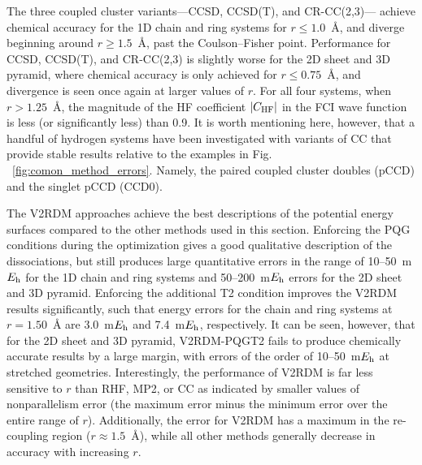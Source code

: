 \documentclass[aip,jcp,amsmath,amssymb, reprint]{revtex4-1}
\newcommand*{\Eh}{$E_{\rm h}$\xspace}
\begin{document}
The three coupled cluster variants---CCSD, CCSD(T), and CR-CC(2,3)--- achieve chemical accuracy for the 1D chain and ring systems for $r\leq1.0$~{\AA}, and diverge beginning around $r\geq1.5$~{\AA}, past the Coulson--Fisher point. 
Performance for CCSD, CCSD(T), and CR-CC(2,3) is slightly worse for the 2D sheet and 3D pyramid, where chemical accuracy is only achieved for $r\leq0.75$~{\AA}, and divergence is seen once again at larger values of $r$.   
For all four systems, when $r>1.25$~{\AA}, the magnitude of the HF coefficient $|C_{\rm{HF}}|$ in the FCI wave function is less (or significantly less) than 0.9.
It is worth mentioning here, however, that a handful of hydrogen systems have been investigated with variants of CC that provide stable results relative to the examples in Fig. ~\ref{fig:comon_method_errors}. Namely, the paired coupled cluster doubles (pCCD) \cite{Limacher2013NewMean} and the singlet pCCD (CCD0). \cite{Bulik2015CanSingle}
           
The V2RDM approaches achieve the best descriptions of the potential energy surfaces compared to the other methods used in this section. Enforcing the PQG conditions during the optimization gives a good qualitative description of the dissociations, but still produces large quantitative errors in the range of 10--50~m\Eh for the 1D chain and ring systems and 50--200~m\Eh errors for the 2D sheet and 3D pyramid.
Enforcing the additional T2 condition improves the V2RDM results significantly, such that energy errors for the chain and ring systems at $r=1.50$~{\AA} are 3.0~m\Eh and 7.4~m\Eh, respectively.
It can be seen, however, that for the 2D sheet and 3D pyramid, V2RDM-PQGT2 fails to produce chemically accurate results by a large margin, with errors of the order of 10--50~m\Eh at stretched geometries.  
Interestingly, the performance of V2RDM is far less sensitive to $r$ than RHF, MP2, or CC as indicated by smaller values of nonparallelism error (the maximum error minus the minimum error over the entire range of $r$). 
Additionally, the error for V2RDM has a maximum in the re-coupling region ($r\approx1.5$~{\AA}), while all other methods generally decrease in accuracy with increasing $r$.
\end{document}
